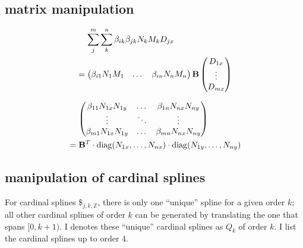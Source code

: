 \documentclass[11pt]{article}
\DeclarePairedDelimiter{\diagfences}{(}{)}
\newcommand{\diag}{\operatorname{diag}\diagfences}
\newcommand{\mB}{\mathbf{B}} %
\renewcommand{\b}[1]{\beta_{#1}}
\begin{document}
\subsection{matrix manipulation}
\begin{align*}
&\mathrel{\phantom{=}}\sum_j^m{\sum_k^n{\b{ik}\b{jk}N_kM_kD_{jx}}} \notag \\
&= 
\begin{pmatrix}
\b{i1}N_1M_1 & \dots & \b{in}N_nM_n
\end{pmatrix}
\mB
\begin{pmatrix}
D_{1x} \\
\vdots \\
D_{mx}
\end{pmatrix}
\end{align*}

\begin{align*}
&\mathrel{\phantom{=}}
\begin{pmatrix}
\b{11}N_{1x}N_{1y} & \dots & \b{1n}N_{nx}N_{ny} \\
\vdots & \ddots & \vdots \\
\b{m1}N_{1x}N_{1y} & \dots & \b{mn}N_{nx}N_{ny}
\end{pmatrix} \notag \\
&=\mB^T\cdot\diag{N_{1x},\dots,N_{nx}}\cdot\diag{N_{1y},\dots,N_{ny}}
\end{align*}

\subsection{manipulation of cardinal splines}
For cardinal splines $\$_{j,k,\mathbb{Z}}$, there is only one ``unique'' spline for a given order $k$; all other cardinal splines of order $k$ can be generated by translating the one that spans $\mathopen[0,k+1\mathclose)$. I denotes these ``unique'' cardinal splines as $Q_k$ of order $k$. I list the cardinal splines up to order $4$.
\end{document}
